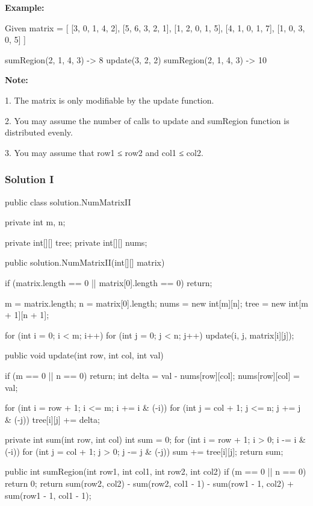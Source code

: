 \textbf{Example:}

\begin{Code}
Given matrix = [
  [3, 0, 1, 4, 2],
  [5, 6, 3, 2, 1],
  [1, 2, 0, 1, 5],
  [4, 1, 0, 1, 7],
  [1, 0, 3, 0, 5]
]

sumRegion(2, 1, 4, 3) -> 8
update(3, 2, 2)
sumRegion(2, 1, 4, 3) -> 10
\end{Code}

\textbf{Note:}

1. The matrix is only modifiable by the update function.

2. You may assume the number of calls to update and sumRegion function is distributed evenly.

3. You may assume that row1 ≤ row2 and col1 ≤ col2.

\subsubsection{Solution I}

\begin{Code}
public class solution.NumMatrixII {
    private int m, n;

    private int[][] tree;
    private int[][] nums;

    public solution.NumMatrixII(int[][] matrix) {
        if (matrix.length == 0 || matrix[0].length == 0) {
            return;
        }

        m = matrix.length;
        n = matrix[0].length;
        nums = new int[m][n];
        tree = new int[m + 1][n + 1];

        for (int i = 0; i < m; i++) {
            for (int j = 0; j < n; j++) {
                update(i, j, matrix[i][j]);
            }
        }
    }

    public void update(int row, int col, int val) {
        if (m == 0 || n == 0) {
            return;
        }
        int delta = val - nums[row][col];
        nums[row][col] = val;

        for (int i = row + 1; i <= m; i += i & (-i)) {
            for (int j = col + 1; j <= n; j += j & (-j)) {
                tree[i][j] += delta;
            }
        }
    }

    private int sum(int row, int col) {
        int sum = 0;
        for (int i = row + 1; i > 0; i -= i & (-i)) {
            for (int j = col + 1; j > 0; j -= j & (-j)) {
                sum += tree[i][j];
            }
        }
        return sum;
    }

    public int sumRegion(int row1, int col1, int row2, int col2) {
        if (m == 0 || n == 0) {
            return 0;
        }
        return sum(row2, col2) - sum(row2, col1 - 1) - sum(row1 - 1, col2) + sum(row1 - 1, col1 - 1);
    }
}
\end{Code}

